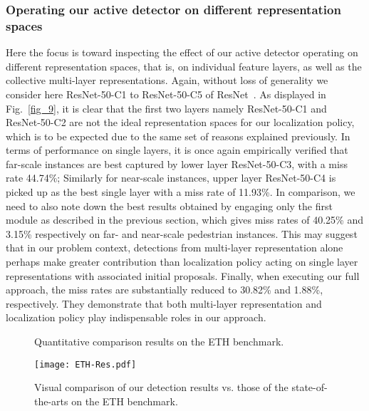 \documentclass[10pt,journal,compsoc,twoside]{IEEEtran}
\begin{document}
\subsubsection{Operating our active detector on different representation spaces}
Here the focus is toward inspecting the effect of our active detector operating on different representation spaces, that is, on individual feature layers,
as well as the collective multi-layer representations. Again, without loss of generality we consider here ResNet-50-C1 to ResNet-50-C5 of ResNet~\cite{HeEtAl:cvpr16}.
As displayed in Fig.~\ref{fig_9}, it is clear that the first two layers namely ResNet-50-C1 and ResNet-50-C2 are not the ideal representation spaces for our localization policy,
which is to be expected due to the same set of reasons explained previously.
In terms of performance on single layers, it is once again empirically verified that far-scale instances are best captured by lower layer ResNet-50-C3, with a miss rate 44.74\%;
Similarly for near-scale instances, upper layer ResNet-50-C4 is picked up as the best single layer with a miss rate of 11.93\%.
%
In comparison, we need to also note down the best results obtained by engaging only the first module as described in the previous section,
which gives miss rates of 40.25\% and 3.15\% respectively on far- and near-scale pedestrian instances.
%
This may suggest that in our problem context,
detections from multi-layer representation alone perhaps make greater contribution than localization policy acting on single layer representations with associated initial proposals.
%
Finally, when executing our full approach, the miss rates are substantially reduced to 30.82\% and 1.88\%, respectively.
%
They demonstrate that both multi-layer representation and localization policy play indispensable roles in our approach.


\begin{figure*}[!t]
\centering
{}
\caption{Quantitative comparison results on the ETH benchmark.}
\label{fig_10}
\end{figure*}

\begin{figure}[!t]
\centering
\texttt{[image: ETH-Res.pdf]}\\
\caption{Visual comparison of our detection results vs. those of the state-of-the-arts on the ETH benchmark.}
\label{fig_ETH_CompareRes}
\end{figure}
\end{document}
